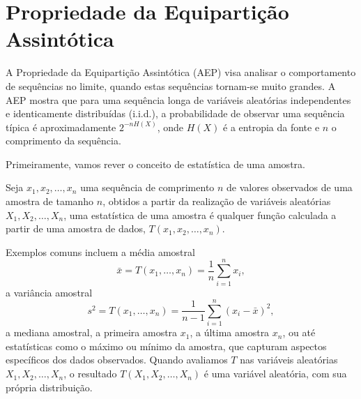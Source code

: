 \chapter{Propriedade da Equipartição Assintótica}

A Propriedade da Equipartição Assintótica (AEP) visa analisar o comportamento
de sequências no limite, quando estas sequências tornam-se muito grandes.  A
AEP mostra que para uma sequência longa de variáveis aleatórias independentes e
identicamente distribuídas (i.i.d.), a probabilidade de observar uma sequência
típica é aproximadamente $2^{-nH(X)}$, onde $H(X)$ é a entropia da fonte e $n$
o comprimento da sequência.

Primeiramente, vamos rever o conceito de estatística de uma amostra.
\begin{definition}
    Seja $x_1, x_2, \ldots, x_n$ uma sequência de comprimento $n$ de valores observados
    de uma amostra de tamanho $n$, obtidos a partir da realização de variáveis aleatórias
    $X_1, X_2, \ldots, X_n$, uma estatística de uma amostra é qualquer função calculada a partir
    de uma amostra de dados, $T(x_1, x_2, \ldots, x_n)$.
\end{definition}
Exemplos comuns incluem a média amostral
\begin{equation}
  \bar{x} = T(x_1, \ldots, x_n) = \frac{1}{n} \sum_{i=1}^n x_i ,
\end{equation}
a variância amostral
\begin{equation}
  s^2 = T(x_1, \ldots, x_n) = \frac{1}{n-1} \sum_{i=1}^n (x_i - \bar{x})^2 ,
\end{equation}
a mediana amostral, a primeira amostra $x_1$, a última amostra $x_n$,
ou até estatísticas como o máximo ou mínimo da amostra, que capturam aspectos específicos dos dados observados.
Quando avaliamos $T$ nas variáveis aleatórias $X_1, X_2, \ldots, X_n$, o resultado $T(X_1,X_2,\ldots,X_n)$
é uma variável aleatória, com sua própria distribuição.


